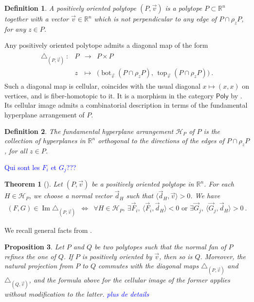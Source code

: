\documentclass[twoside, 12pt]{amsart}
\newtheorem{definition}{Definition}[section]
\newtheorem{proposition}[definition]{Proposition}
\newtheorem{theorem}{Theorem}
\theoremstyle{remark}
\newcommand{\RR}{\mathbb{R}}
\newcommand{\PolySub}{\mathsf{Poly}}
\DeclareMathOperator{\tp}{top}
\DeclareMathOperator{\bm}{bot}
\DeclareMathOperator{\Ima}{Im} %
\newcommand{\Guillaume}[1]{\textcolor{blue}{#1}}
\begin{document}
\begin{definition}
A \emph{positively oriented polytope} $(P, \vec v)$ is a polytope $P \subset \RR^n$ together with a vector $\vec v\in \RR^n$ which is not perpendicular to any edge of $P\cap \rho_z P$, for any $z \in P$.
\end{definition}

Any positively oriented polytope admits a diagonal map of the form
\begin{align*}
\begin{array}{rlcl}
\triangle_{(P,\vec v)}\  : & P &\to  &P \times P\\
&z & \mapsto& 
\bigl(\bm_{\vec v}(P\cap \rho_zP),\,  \tp_{\vec v}(P\cap \rho_z P)\bigr) \ .
\end{array}
\end{align*}
Such a diagonal map is cellular, coincides with the usual diagonal $x\mapsto (x, x)$ on vertices, and is fiber-homotopic to it. It is a morphism in the category $\PolySub$ by \cite[Proposition~5]{MTTV19}.
Its cellular image admits a combinatorial description in terms of the fundamental hyperplane arrangement of $P$.

\begin{definition}
  \label{def:fundamentalhyperplane} 
  The \emph{fundamental hyperplane arrangement} $\mathcal{H}_P$ of $P$ is the collection of hyperplanes in $\RR^n$ orthogonal to the directions of the edges of $P\cap\rho_z P$, for all $z \in P$. 
\end{definition}

\Guillaume{Qui sont les $F_i$ et $G_j$???}

\begin{theorem}[{\cite[Theorem 1.23]{LA21}}]
  \label{thm:universalformula} 
  Let $(P,\vec v)$ be a positively oriented polytope in $\RR^n$. For each $H\in\mathcal{H}_P$, we choose a normal vector $\vec d_H$ such that $\langle \vec d_H, \vec v \rangle >0$. We have 
\begin{eqnarray*}
  (F,G) \in \Ima \triangle_{(P,\vec v)} 
  &\iff&  \forall H \in \mathcal{H}_P , \ \exists \vec F_i , \ \langle \vec F_i, \vec d_H \rangle < 0  \text{ or } \exists \vec G_j , \ \langle \vec G_j, \vec d_H \rangle > 0 \ . 
\end{eqnarray*} 
\end{theorem}

We recall general facts from \cite[Section 1.6]{LA21}. 

\begin{proposition} 
\label{prop:refinementofnormalfans}
Let $P$ and $Q$ be two polytopes such that the normal fan of $P$ refines the one of $Q$. 
If $P$ is positively oriented by $\vec v$, then so is $Q$. 
Moreover, the natural projection from $P$ to $Q$ commutes with the diagonal maps $\triangle_{(P,\vec v)}$ and $\triangle_{(Q,\vec v)}$, and the formula above for the cellular image of the former applies without modification to the latter.  \Guillaume{plus de details}
\end{proposition}
\end{document}
